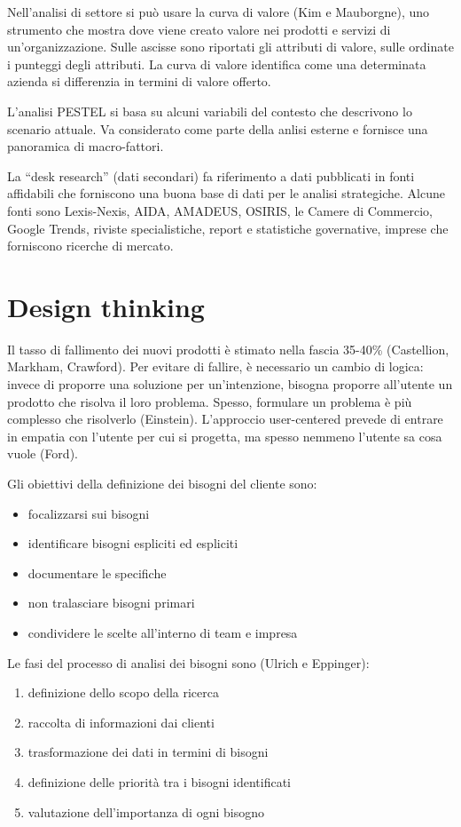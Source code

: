 \documentclass[answers, a4paper, 11pt]{exam}
\begin{document}
Nell'analisi di settore si può usare la curva di valore (Kim e Mauborgne), uno strumento che mostra dove viene creato valore nei prodotti e servizi di un'organizzazione.
Sulle ascisse sono riportati gli attributi di valore, sulle ordinate i punteggi degli attributi.
La curva di valore identifica come una determinata azienda si differenzia in termini di valore offerto.

L'analisi PESTEL si basa su alcuni variabili del contesto che descrivono lo scenario attuale. Va considerato come parte della anlisi esterne e fornisce una panoramica di macro-fattori. 

La ``desk research'' (dati secondari) fa riferimento a dati pubblicati in fonti affidabili che forniscono una buona base di dati per le analisi strategiche.
Alcune fonti sono Lexis-Nexis, AIDA, AMADEUS, OSIRIS, le Camere di Commercio, Google Trends, riviste specialistiche, report e statistiche governative, imprese che forniscono ricerche di mercato.

\section{Design thinking}
 
Il tasso di fallimento dei nuovi prodotti è stimato nella fascia 35-40\% (Castellion, Markham, Crawford).
Per evitare di fallire, è necessario un cambio di logica: invece di proporre una soluzione per un'intenzione, bisogna proporre all'utente un prodotto che risolva il loro problema.
Spesso, formulare un problema è più complesso che risolverlo (Einstein).
L'approccio user-centered prevede di entrare in empatia con l'utente per cui si progetta, ma spesso nemmeno l'utente sa cosa vuole (Ford).

Gli obiettivi della definizione dei bisogni del cliente sono:

\begin{itemize}
    \item focalizzarsi sui bisogni
    \item identificare bisogni espliciti ed espliciti
    \item documentare le specifiche
    \item non tralasciare bisogni primari
    \item condividere le scelte all'interno di team e impresa
\end{itemize}

Le fasi del processo di analisi dei bisogni sono (Ulrich e Eppinger):

\begin{enumerate}
    \item definizione dello scopo della ricerca
    \item raccolta di informazioni dai clienti
    \item trasformazione dei dati in termini di bisogni
    \item definizione delle priorità tra i bisogni identificati
    \item valutazione dell'importanza di ogni bisogno 
\end{enumerate}
 
\end{document}
